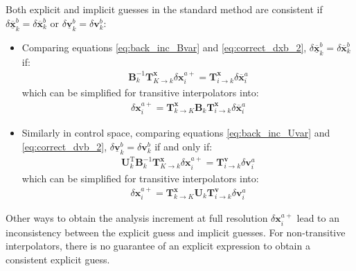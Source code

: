 \documentclass[12pt]{scrartcl}
\begin{document}
$  $\\
Both explicit and implicit guesses in the standard method are consistent if $\delta \underline{\overline{\mathbf{x}}}^b_k = \delta \overline{\mathbf{x}}^b_k$ or $\delta \underline{\mathbf{v}}^b_k = \delta \mathbf{v}^b_k$:
\begin{itemize}
\item Comparing equations \eqref{eq:back_inc_Bvar} and \eqref{eq:correct_dxb_2}, $\delta \underline{\overline{\mathbf{x}}}^b_k = \delta \overline{\mathbf{x}}^b_k$ if:
\begin{align}
\mathbf{B}^{-1}_k \mathbf{T}^\mathbf{x}_{K \rightarrow k} \delta \mathbf{x}^{a+}_i = \mathbf{T}^\mathbf{x}_{i \rightarrow k} \delta \overline{\mathbf{x}}^a_i
\end{align}
which can be simplified for transitive interpolators into:
\begin{align}
\label{eq:consistency_condition_model}
\boxed{\delta \mathbf{x}^{a+}_i = \mathbf{T}^\mathbf{x}_{k \rightarrow K} \mathbf{B}_k \mathbf{T}^\mathbf{x}_{i \rightarrow k} \delta \overline{\mathbf{x}}^a_i}
\end{align}
\item Similarly in control space, comparing equations \eqref{eq:back_inc_Uvar} and \eqref{eq:correct_dvb_2}, $\delta \underline{\mathbf{v}}^b_k = \delta \mathbf{v}^b_k$ if and only if:
\begin{align}
\mathbf{U}_k^\mathrm{T} \mathbf{B}^{-1}_k \mathbf{T}^\mathbf{x}_{K \rightarrow k} \delta \mathbf{x}^{a+}_i = \mathbf{T}^\mathbf{v}_{i \rightarrow k} \delta \mathbf{v}^a_i
\end{align}
which can be simplified for transitive interpolators into:
\begin{align}
\label{eq:consistency_condition_control}
\boxed{\delta \mathbf{x}^{a+}_i = \mathbf{T}^\mathbf{x}_{k \rightarrow K} \mathbf{U}_k \mathbf{T}^\mathbf{v}_{i \rightarrow k} \delta \mathbf{v}^a_i}
\end{align}
\end{itemize}
Other ways to obtain the analysis increment at full resolution $\delta \mathbf{x}^{a+}_i$ lead to an inconsistency between the explicit guess and implicit guesses. For non-transitive interpolators, there is no guarantee of an explicit expression to obtain a consistent explicit guess.
\end{document}
